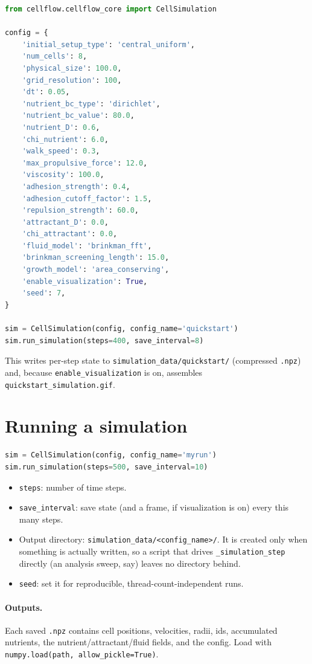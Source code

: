 \documentclass[11pt]{article}
\newcommand{\code}[1]{\texttt{#1}}
\begin{document}
\begin{lstlisting}[language=Python]
from cellflow.cellflow_core import CellSimulation

config = {
    'initial_setup_type': 'central_uniform',
    'num_cells': 8,
    'physical_size': 100.0,
    'grid_resolution': 100,
    'dt': 0.05,
    'nutrient_bc_type': 'dirichlet',
    'nutrient_bc_value': 80.0,
    'nutrient_D': 0.6,
    'chi_nutrient': 6.0,
    'walk_speed': 0.3,
    'max_propulsive_force': 12.0,
    'viscosity': 100.0,
    'adhesion_strength': 0.4,
    'adhesion_cutoff_factor': 1.5,
    'repulsion_strength': 60.0,
    'attractant_D': 0.0,
    'chi_attractant': 0.0,
    'fluid_model': 'brinkman_fft',
    'brinkman_screening_length': 15.0,
    'growth_model': 'area_conserving',
    'enable_visualization': True,
    'seed': 7,
}

sim = CellSimulation(config, config_name='quickstart')
sim.run_simulation(steps=400, save_interval=8)
\end{lstlisting}

This writes per-step state to \code{simulation\_data/quickstart/} (compressed
\code{.npz}) and, because \code{enable\_visualization} is on, assembles
\code{quickstart\_simulation.gif}.

\section{Running a simulation}

\begin{lstlisting}[language=Python]
sim = CellSimulation(config, config_name='myrun')
sim.run_simulation(steps=500, save_interval=10)
\end{lstlisting}

\begin{itemize}
  \item \code{steps}: number of time steps.
  \item \code{save\_interval}: save state (and a frame, if visualization is on)
        every this many steps.
  \item Output directory: \code{simulation\_data/<config\_name>/}. It is created
        only when something is actually written, so a script that drives
        \code{\_simulation\_step} directly (an analysis sweep, say) leaves no
        directory behind.
  \item \code{seed}: set it for reproducible, thread-count-independent runs.
\end{itemize}

\paragraph{Outputs.} Each saved \code{.npz} contains cell positions, velocities,
radii, ids, accumulated nutrients, the nutrient/attractant/fluid fields, and the
config. Load with \code{numpy.load(path, allow\_pickle=True)}.
\end{document}
